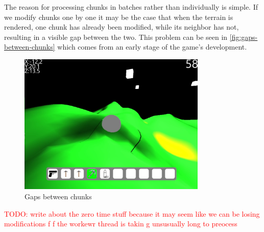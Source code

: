 The reason for processing chunks in batches rather than individually is simple.
If we modify chunks one by one it may be the case that when the terrain is rendered, one chunk has already been modified, while its neighbor has not, resulting in a visible gap between the two.
This problem can be seen in \autoref{fig:gaps-between-chunks} which comes from an early stage of the game's development.
\begin{figure}[h]
    \centering
    \includegraphics[width=0.8\textwidth]{chapters/system_architecture/sections/chunk_worker/resources/gaps-between-chunks.png}
    \caption{Gaps between chunks}
    \label{fig:gaps-between-chunks}
\end{figure}

\textcolor{red}{TODO: write about the zero time stuff because it may seem like we can be losing modifications f f the workewr thread is takin g unsusually long to preocess}